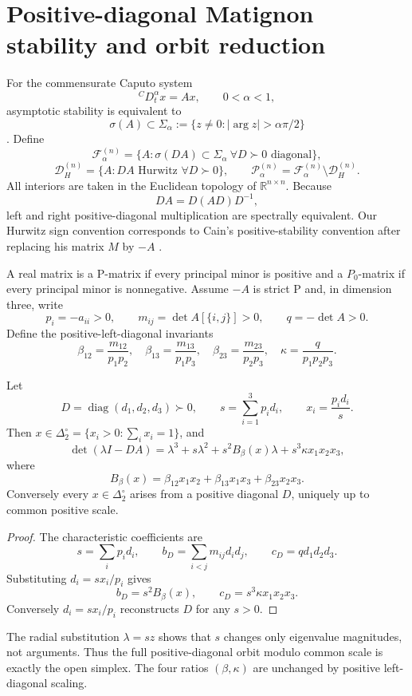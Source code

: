 \section{Positive-diagonal Matignon stability and orbit reduction}
\label{sec:framework}

For the commensurate Caputo system
\[
{}^C D_t^\alpha x=Ax,
\qquad 0<\alpha<1,
\]
asymptotic stability is equivalent to
\[
\sigma(A)\subset
\Sigma_\alpha
:=
\{z\neq0:|\arg z|>\alpha\pi/2\}
\]
\citep{Matignon1996,BrandiburGarrappaKaslik2021}. Define
\[
\mathcal F_\alpha^{(n)}
=
\{A:\sigma(DA)\subset\Sigma_\alpha
\ \forall D\succ0\text{ diagonal}\},
\]
\[
\mathcal D_H^{(n)}
=
\{A:DA\text{ Hurwitz }\forall D\succ0\},
\qquad
\mathcal P_\alpha^{(n)}
=
\mathcal F_\alpha^{(n)}\setminus\mathcal D_H^{(n)}.
\]
All interiors are taken in the Euclidean topology of \(\mathbb R^{n\times n}\). Because
\[
DA=D(AD)D^{-1},
\]
left and right positive-diagonal multiplication are spectrally equivalent. Our Hurwitz sign convention corresponds to Cain's positive-stability convention after replacing his matrix \(M\) by \(-A\) \citep{Cain1976}.

A real matrix is a P-matrix if every principal minor is positive and a \(P_0\)-matrix if every principal minor is nonnegative. Assume \(-A\) is strict P and, in dimension three, write
\[
p_i=-a_{ii}>0,
\qquad
m_{ij}=\det A[\{i,j\}]>0,
\qquad
q=-\det A>0.
\]
Define the positive-left-diagonal invariants
\[
\beta_{12}=\frac{m_{12}}{p_1p_2},
\quad
\beta_{13}=\frac{m_{13}}{p_1p_3},
\quad
\beta_{23}=\frac{m_{23}}{p_2p_3},
\quad
\kappa=\frac{q}{p_1p_2p_3}.
\]

\begin{lemma}
\label{lem:simplex-reduction}
Let
\[
D=\operatorname{diag}(d_1,d_2,d_3)\succ0,
\qquad
s=\sum_{i=1}^3p_id_i,
\qquad
x_i=\frac{p_id_i}{s}.
\]
Then \(x\in\Delta_2^\circ=\{x_i>0:\sum_i x_i=1\}\), and
\[
\det(\lambda I-DA)
=
\lambda^3+s\lambda^2+s^2B_\beta(x)\lambda
+s^3\kappa x_1x_2x_3,
\]
where
\[
B_\beta(x)
=
\beta_{12}x_1x_2+
\beta_{13}x_1x_3+
\beta_{23}x_2x_3.
\]
Conversely every \(x\in\Delta_2^\circ\) arises from a positive diagonal \(D\), uniquely up to common positive scale.
\end{lemma}

\begin{proof}
The characteristic coefficients are
\[
s=\sum_i p_id_i,
\qquad
b_D=\sum_{i<j}m_{ij}d_id_j,
\qquad
c_D=qd_1d_2d_3.
\]
Substituting \(d_i=sx_i/p_i\) gives
\[
b_D=s^2B_\beta(x),
\qquad
c_D=s^3\kappa x_1x_2x_3.
\]
Conversely \(d_i=sx_i/p_i\) reconstructs \(D\) for any \(s>0\).
\end{proof}

The radial substitution \(\lambda=sz\) shows that \(s\) changes only eigenvalue magnitudes, not arguments. Thus the full positive-diagonal orbit modulo common scale is exactly the open simplex. The four ratios \((\beta,\kappa)\) are unchanged by positive left-diagonal scaling.
